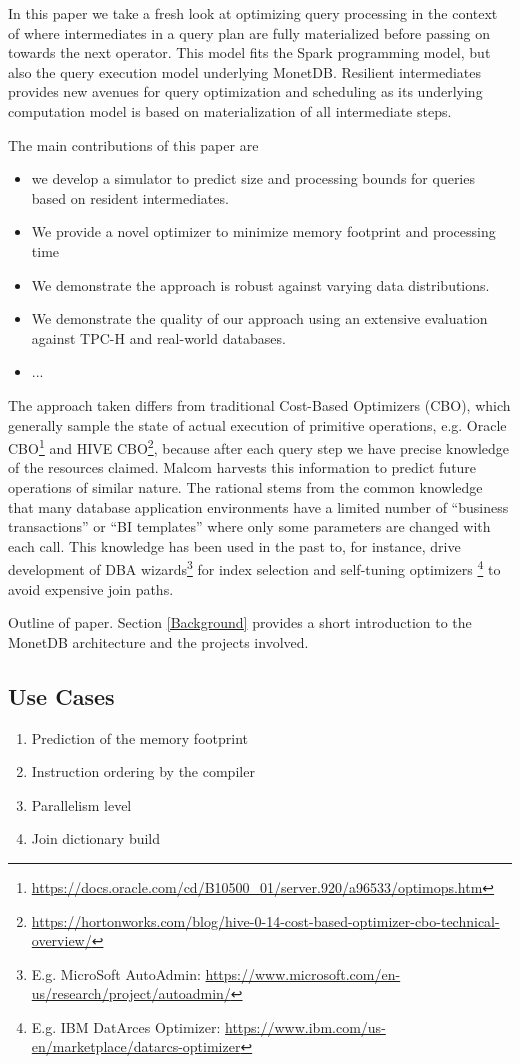 In this paper we take a fresh look at optimizing query processing in the context
of where intermediates in a query plan are fully materialized before passing on
towards the next operator. This model fits the Spark programming model,
but also the query execution model underlying MonetDB.
Resilient intermediates provides new avenues for query optimization and
scheduling as its underlying computation model is based on
materialization of all intermediate steps.

The main contributions of this paper are
\begin{itemize}
	\item we develop a simulator to predict size and processing bounds for queries based on resident intermediates.
	\item We provide a novel optimizer to minimize memory footprint and processing time
	\item We demonstrate the approach is robust against varying data distributions.
	\item We demonstrate the quality of our approach using an extensive evaluation against TPC-H and real-world databases.
	\item ...
\end{itemize}

The approach taken differs from traditional Cost-Based Optimizers (CBO), which generally sample the state of actual execution of primitive operations, e.g. Oracle CBO\footnote{\url{https://docs.oracle.com/cd/B10500_01/server.920/a96533/optimops.htm}} and HIVE CBO\footnote{\url{https://hortonworks.com/blog/hive-0-14-cost-based-optimizer-cbo-technical-overview/}}, because after each query step we have precise knowledge of the resources claimed.
Malcom harvests this information to predict future operations of similar nature.
The rational stems from the common knowledge that many database application
environments have a limited number of ``business transactions'' or ``BI templates'' where only some parameters are changed with each call.
This knowledge has been used in the past to, for instance, drive development of DBA wizards\footnote{E.g. MicroSoft AutoAdmin: \url{https://www.microsoft.com/en-us/research/project/autoadmin/}} for index selection and self-tuning optimizers \footnote{E.g. IBM DatArces Optimizer: \url{https://www.ibm.com/us-en/marketplace/datarcs-optimizer}} to avoid expensive join paths.

Outline of paper. Section \ref{Background} provides a short introduction
to the MonetDB architecture and the projects involved.

\subsection{Use Cases}
\begin{enumerate}
  \item Prediction of the memory footprint
  \item Instruction ordering by the compiler
  \item Parallelism level
  \item Join dictionary build
\end{enumerate}
